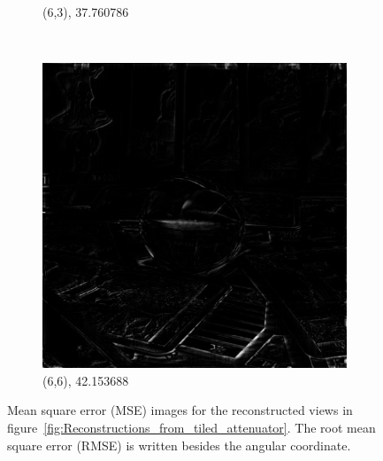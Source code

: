 \documentclass[11pt,a4paper,titlepage]{article}
\begin{document}
\begin{figure}
\begin{subfigure}[t]{0.3\textwidth}
		\caption{(6,3), 37.760786}
	\end{subfigure}%
	~
	\begin{subfigure}[t]{0.3\textwidth}
		\includegraphics[width=\textwidth]{results/tile_blending/tarot6x6x512x512-512x512x5-sampling=2x_tileRes=200x200_overlap=0.5/MSE_for_view_(6,6).png}
		\caption{(6,6), 42.153688}
	\end{subfigure}%
	
	\caption{Mean square error (MSE) images for the reconstructed views in figure~\ref{fig:Reconstructions_from_tiled_attenuator}. The root mean square error (RMSE) is written besides the angular coordinate.}
	\label{fig:MSE_for_reconstructions_from_tiled_attenuator}
\end{figure}
\end{document}

